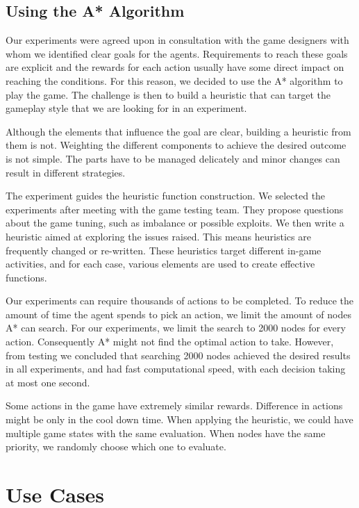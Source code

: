 \documentclass[letterpaper]{article} %
\begin{document}
\subsection{Using the A* Algorithm}

Our experiments were agreed upon in consultation with the game designers with whom we identified clear goals for the agents. Requirements to reach these goals are explicit and the rewards for each action usually have some direct impact on reaching the conditions. For this reason, we decided to use the A* algorithm to play the game. The challenge is then to build a heuristic that can target the gameplay style that we are looking for in an experiment.

Although the elements that influence the goal are clear, building a heuristic from them is not. Weighting the different components to achieve the desired outcome is not simple. The parts have to be managed delicately and minor changes can result in different strategies.

The experiment guides the heuristic function construction. We selected the experiments after meeting with the game testing team. They propose questions about the game tuning, such as imbalance or possible exploits. We then write a heuristic aimed at exploring the issues raised. This means heuristics are frequently changed or re-written. These heuristics target different in-game activities, and for each case, various elements are used to create effective functions.

Our experiments can require thousands of actions to be completed. To reduce the amount of time the agent spends to pick an action, we limit the amount of nodes A* can search. For our experiments, we limit the search to 2000 nodes for every action. Consequently A* might not find the optimal action to take. However, from testing we concluded that searching 2000 nodes achieved the desired results in all experiments, and had fast computational speed, with each decision taking at most one second.

Some actions in the game have extremely similar rewards. Difference in actions might be only in the cool down time. When applying the heuristic, we could have multiple game states with the same evaluation.
When nodes have the same priority, we randomly choose which one to evaluate.

\section{Use Cases}
\end{document}
